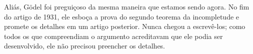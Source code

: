 \documentclass[../../../include/open-logic-section]{subfiles}
\begin{document}
\begin{digress}
Aliás, G\"odel foi preguiçoso da mesma maneira que estamos sendo agora. No
fim do artigo de 1931, ele esboça a prova do segundo teorema da incompletude
e promete os detalhes em um artigo posterior. Nunca chegou a escrevê-los;
como todos os que compreendiam o argumento acreditavam que ele podia ser
desenvolvido, ele não precisou preencher os detalhes.
\end{digress}
\end{document}
